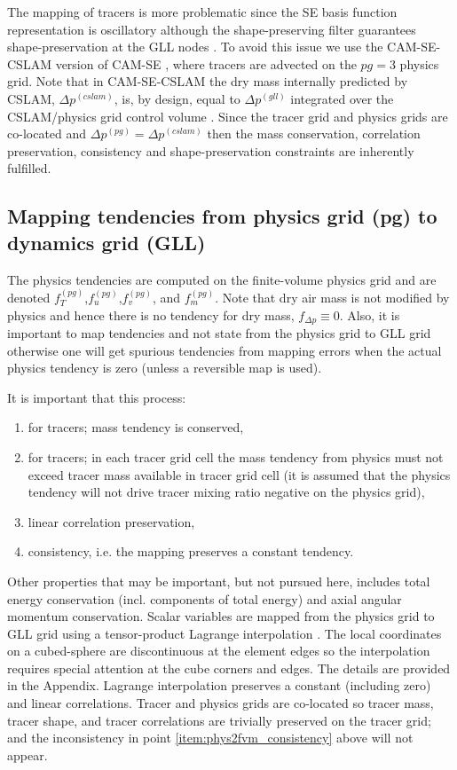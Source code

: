 \documentclass[twocol]{ametsoc}
\begin{document}
The mapping of tracers is more problematic since the SE basis function representation is oscillatory although the shape-preserving filter guarantees shape-preservation at the GLL nodes \citep{GTS2014JCP}. To avoid this issue we use the CAM-SE-CSLAM version of CAM-SE \citep[Conservative Semi-Lagrangian Multi-tracer transport scheme][]{LTOUNGK2017MWR}, where tracers are advected on the $pg=3$ physics grid. Note that in CAM-SE-CSLAM the dry mass internally predicted by CSLAM, $\Delta p^{(cslam)}$, is, by design, equal to $\Delta p^{(gll)}$ integrated over the CSLAM/physics grid control volume \citep{LTOUNGK2017MWR}. Since the tracer grid and physics grids are co-located and $\Delta p^{(pg)}=\Delta p^{(cslam)}$ then the  mass conservation, correlation preservation, consistency and shape-preservation constraints are inherently fulfilled.
%
\subsection{Mapping tendencies from physics grid (pg) to dynamics grid (GLL)}
The physics tendencies are computed on the finite-volume physics grid and are denoted $f_T^{(pg)}$,$f_u^{(pg)}$,$f_v^{(pg)}$, and $f_m^{(pg)}$. Note that dry air mass is not modified by physics and hence there is no tendency for dry mass,  $f_{\Delta p}\equiv 0$. Also, it is important to map tendencies and not state from the physics grid to GLL grid otherwise one will get spurious tendencies from mapping errors when the actual physics tendency is zero (unless a reversible map is used).

It is important that this process:
\begin{enumerate}
\item for tracers; mass tendency is conserved,
\item for tracers; in each tracer grid cell the mass tendency from physics must not exceed tracer mass available in tracer grid cell (it is assumed that the physics tendency will not drive tracer mixing ratio negative on the physics grid),\label{item:phys2fvm_consistency}
\item linear correlation preservation,
\item consistency, i.e. the mapping preserves a constant tendency.
\end{enumerate}
Other properties that may be important, but not pursued here, includes total energy conservation (incl. components of total energy) and axial angular momentum conservation. Scalar variables are mapped from {\color{red}the{}} physics grid to GLL grid using a tensor-product Lagrange interpolation {\color{red}{in two dimensions (i.e. we assume that the pressure variations in the vertical are small)}}. The local coordinates on a cubed-sphere are discontinuous at the element edges so the interpolation requires special attention at the cube corners and edges. The details are provided in the Appendix. Lagrange interpolation preserves a constant (including zero) and linear correlations. Tracer and physics grids are co-located so tracer mass, tracer shape, and tracer correlations are trivially preserved on the tracer grid; and the inconsistency in point \ref{item:phys2fvm_consistency} above will not appear. 
\end{document}
